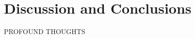 
\graphicspath{{chapters/Discussion/figures}}

\chapter{Discussion and Conclusions}

PROFOUND THOUGHTS


